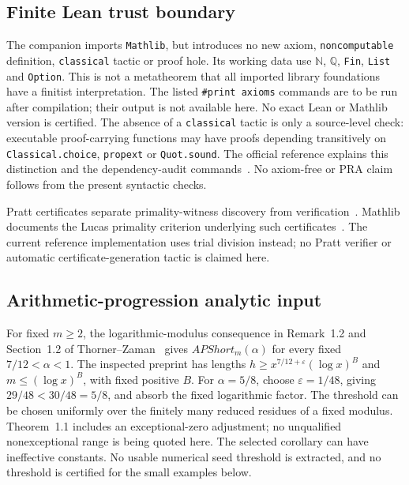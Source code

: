 \documentclass[11pt,reqno]{amsart}
\makeatletter
\newcommand{\N}{\mathbb N}
\newcommand{\Q}{\mathbb Q}
\theoremstyle{blueplain}
\newcommand{\defref}[1]{\hyperref[#1]{Definition~\ref*{#1}}}
\numberwithin{equation}{section}
\DeclareRobustCommand{\defref}[1]{%
  \hyperlink{def:#1}{\ensuremath{\csname PredicateName@#1\endcsname}}}
\def\defref#1{#1}%
\def\hyperlink#1#2{#2}}
\makeatother
\begin{document}
\subsection{Finite Lean trust boundary}
The companion imports \texttt{Mathlib}, but introduces no new axiom,
\texttt{noncomputable} definition, \texttt{classical} tactic or proof hole.
Its working data use \(\N\), \(\Q\), \hyperlink{def:Fin}{\texttt{Fin}}, \texttt{List} and
\texttt{Option}. This is not a metatheorem that all imported library
foundations have a finitist interpretation. The listed
\texttt{\#print axioms} commands are to be run after compilation; their
output is not available here. No exact Lean or Mathlib version is certified.
The absence of a \texttt{classical} tactic is only a source-level check:
executable proof-carrying functions may have proofs depending transitively
on \texttt{Classical.choice}, \texttt{propext} or \texttt{Quot.sound}.
The official reference explains this distinction and the dependency-audit
commands~\cite{LeanAxioms}. No axiom-free or \hyperlink{abbr:PRA}{PRA} claim follows from the
present syntactic checks.

Pratt certificates separate primality-witness discovery from
verification~\cite{Pratt1975}. Mathlib documents the Lucas primality
criterion underlying such certificates~\cite{MathlibLucas}. The current
reference implementation uses trial division instead; no Pratt verifier
or automatic certificate-generation tactic is claimed here.



\subsection{Arithmetic-progression analytic input}\label{sec:ap-input}
\hypertarget{term:AP}{}
For fixed \(m\ge2\), the logarithmic-modulus consequence in Remark~1.2
and Section~1.2 of Thorner--Zaman~\cite{ThornerZaman2024} gives
\(\defref{APShort}_m(\alpha)\) for every fixed \(7/12<\alpha<1\).
The inspected preprint has lengths
\(h\ge x^{7/12+\varepsilon}(\log x)^B\) and
\(m\le(\log x)^B\), with fixed positive \(B\). For \(\alpha=5/8\),
choose \(\varepsilon=1/48\), giving \(29/48<30/48=5/8\), and absorb
the fixed logarithmic factor. The threshold can be chosen uniformly
over the finitely many reduced residues of a fixed modulus.
Theorem~1.1 includes an exceptional-zero adjustment; no unqualified
nonexceptional range is being quoted here. The selected corollary can
have ineffective constants. No usable numerical seed threshold is
extracted, and no threshold is certified for the small examples below.
\end{document}
